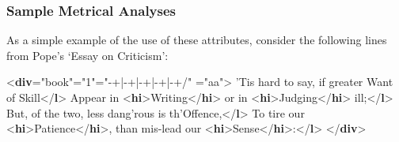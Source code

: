 \subsubsection[{Sample Metrical Analyses}]{Sample Metrical Analyses}\label{VEMEsamp}\par
As a simple example of the use of these attributes, consider the following lines from Pope's ‘Essay on Criticism’: \par\bgroup{}\exampleFont \begin{shaded}\noindent\mbox{}{<\textbf{div}\hspace*{1em}{type}="{book}"\hspace*{1em}{n}="{1}"\hspace*{1em}{met}="{-+|-+|-+|-+|-+/}"\mbox{}\newline 
\hspace*{1em}{rhyme}="{aa}">}\mbox{}\newline 
{}\mbox{}\newline 
\hspace*{1em}'Tis hard to say, if greater Want of Skill{</\textbf{l}>}\mbox{}\newline 
\hspace*{1em}Appear in {<\textbf{hi}>}Writing{</\textbf{hi}>} or in {<\textbf{hi}>}Judging{</\textbf{hi}>} ill;{</\textbf{l}>}\mbox{}\newline 
\hspace*{1em}But, of the two, less dang'rous is th'Offence,{</\textbf{l}>}\mbox{}\newline 
\hspace*{1em}To tire our {<\textbf{hi}>}Patience{</\textbf{hi}>}, than mis-lead our {<\textbf{hi}>}Sense{</\textbf{hi}>}:{</\textbf{l}>}\mbox{}\newline 
{}\mbox{}\newline 
{</\textbf{div}>}\end{shaded}\egroup\par \noindent  \par
